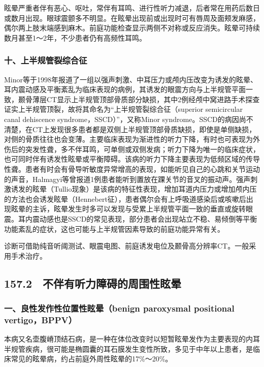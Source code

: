 眩晕严重者伴有恶心、呕吐，常伴有耳鸣、进行性听力减退，后者常在用药后数日或数月出现。眼球震颤多不明显。在眩晕出现前或出现时可有唇周及面颊发麻感，偶尔两上肢末端感到麻木。前庭功能检查显示两侧不对称或反应消失。眩晕可持续数月甚至1～2年，不少患者仍有高频性耳鸣。

\subsubsection{十、上半规管裂综合征}

Minor等于1998年报道了一组以强声刺激、中耳压力或颅内压改变为诱发的眩晕、耳内震动感及平衡紊乱为临床表现的病例，其诱发的眼震方向与上半规管平面一致，颞骨薄层CT显示上半规管顶部骨质部分缺损，其中2例经颅中窝进路手术探查证实上半规管顶裂，故将其命名为“上半规管裂综合征（superior
semicircular canal dehiscence syndrome，SSCD）”，又称Minor
syndrome。SSCD的病因尚不清楚，在CT上发现很多患者都是双侧上半规管顶部骨质缺损，即使是单侧缺损，对侧的骨质往往也会变薄。主要临床表现为渐进性的听力下降，有时也可表现为外伤后的突发性聋，多不伴耳鸣，可单侧或双侧发病；听力下降为唯一的临床症状，也可同时伴有诱发性眩晕或平衡障碍。该病的听力下降主要表现为低频区域的传导性聋。患者有时会有骨导听敏度异常增高的表现，如能听见自己的心跳和关节运动的声音，Halmagyi等曾报道1例患者能听到置放在踝关节的音叉的振动声。强声刺激诱发的眩晕（Tullio现象）是该病的特征性表现，增加耳道内压力或增加颅内压的方法也会诱发眩晕（Hennebert征），患者偶尔会有上呼吸道感染后或咳嗽后出现眩晕的主诉，眩晕发生时多可以发现与受累上半规管平面一致的垂直或旋转眼震。耳内震动感也是SSCD的常见表现，部分患者会出现站立不稳、易倾倒等平衡功能紊乱的症状，这也可能与上半规管因素导致的前庭功能异常有关。

诊断可借助纯音听阈测试、眼震电图、前庭诱发电位及颞骨高分辨率CT。一般采用手术治疗。

\protect\hypertarget{text00360.html}{}{}

\subsection{157.2　不伴有听力障碍的周围性眩晕}

\subsubsection{一、良性发作性位置性眩晕（benign paroxysmal positional vertigo，BPPV）}

本病又名壶腹嵴顶结石病，是一种在体位改变时以短暂眩晕发作为主要表现的内耳半规管疾病，很可能是椭圆囊的耳石膜发生变性所致，多见于中年以上患者，是临床常见的眩晕病，约占前庭外周性眩晕的17\%～20\%。

